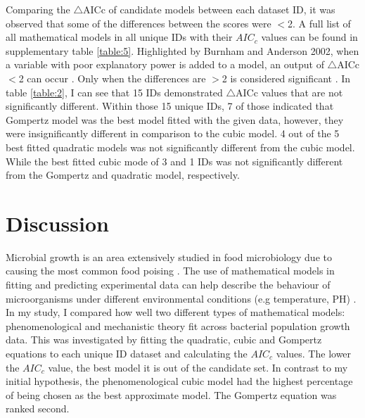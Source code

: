 \documentclass[11pt]{article}
\begin{document}
Comparing the $\triangle$AICc of candidate models between each dataset ID, it was observed that some of the differences between the scores were $<$2. 
A full list of all mathematical models in all unique IDs with their $AIC_{c}$ values can be found in supplementary table \ref{table:5}. Highlighted
by Burnham and Anderson 2002, when a variable with poor explanatory power is added to a model, an output of $\triangle$AICc$<$2 can 
occur \cite{Burnham_basic_2002,arnold_uninformative_2010}. Only when the differences are $>$2 is considered significant \cite{wyss_seismicity_2012}. 
In table \ref{table:2}, I can see that 15 IDs demonstrated $\triangle$AICc values that are not significantly different. Within those 15
unique IDs, 7 of those indicated that Gompertz model was the best model fitted with the given data, however, they were insignificantly different in comparison
to the cubic model. 4 out of the 5 best fitted quadratic models was not significantly different from the cubic model. While the best fitted cubic mode of 3 and
1 IDs was not significantly different from the Gompertz and quadratic model, respectively.

\section{Discussion}

Microbial growth is an area extensively studied in food microbiology due to causing the most common food poising \cite{buchanan_when_1997,xiong_comparison_1999}. The use of mathematical models
in fitting and predicting experimental data can help describe the behaviour of microorganisms under different environmental conditions (e.g temperature, PH) \cite{zwietering_modeling_1990}.
In my study, I compared how well two different types of mathematical models: phenomenological and mechanistic theory fit across bacterial population
growth data. This was investigated by fitting the quadratic, cubic and Gompertz equations to each unique ID dataset and calculating the $AIC_{c}$ values. 
The lower the $AIC_{c}$ value, the best model it is out of the candidate set. In contrast to my initial hypothesis, the phenomenological cubic model 
had the highest percentage of being chosen as the best approximate model. The Gompertz equation was ranked second.  
\end{document}
